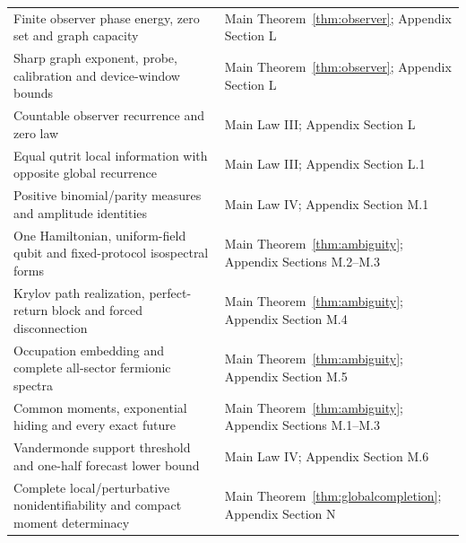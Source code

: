 \begin{longtable}{@{}>{\raggedright\arraybackslash}p{}
  >{\raggedright\arraybackslash}p{}@{}}
Finite observer phase energy, zero set and graph capacity & Main
Theorem~\ref{thm:observer};
Appendix Section L \\
Sharp graph exponent, probe, calibration and device-window bounds & Main
Theorem~\ref{thm:observer}; Appendix Section L \\
Countable observer recurrence and zero law & Main Law III; Appendix Section
L \\
Equal qutrit local information with opposite global recurrence & Main Law
III; Appendix Section L.1 \\
Positive binomial/parity measures and amplitude identities & Main Law IV;
Appendix Section M.1 \\
One Hamiltonian, uniform-field qubit and fixed-protocol isospectral forms &
Main Theorem~\ref{thm:ambiguity}; Appendix Sections M.2--M.3 \\
Krylov path realization, perfect-return block and forced disconnection & Main
Theorem~\ref{thm:ambiguity}; Appendix Section M.4 \\
Occupation embedding and complete all-sector fermionic spectra & Main
Theorem~\ref{thm:ambiguity}; Appendix Section M.5 \\
Common moments, exponential hiding and every exact future & Main
Theorem~\ref{thm:ambiguity};
Appendix Sections M.1--M.3 \\
Vandermonde support threshold and one-half forecast lower bound & Main Law IV;
Appendix Section M.6 \\
Complete local/perturbative nonidentifiability and compact moment determinacy &
Main Theorem~\ref{thm:globalcompletion}; Appendix Section N \\
\bottomrule
\end{longtable}

